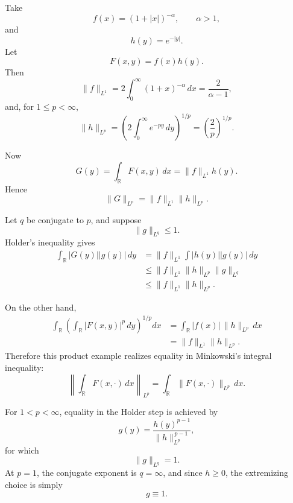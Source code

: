 \begin{solution}
Take
\[
f(x)
=
(1+|x|)^{-\alpha},
\qquad
\alpha>1,
\]
and
\[
h(y)=e^{-|y|}.
\]
Let
\[
F(x,y)=f(x)h(y).
\]
Then
\[
\|f\|_{L^1}
=
2\int_0^\infty(1+x)^{-\alpha}\,dx
=
\boxed{\frac{2}{\alpha-1}},
\]
and, for \(1\le p<\infty\),
\[
\|h\|_{L^p}
=
\left(
2\int_0^\infty e^{-py}\,dy
\right)^{1/p}
=
\boxed{
\left(\frac2p\right)^{1/p}.
}
\]

Now
\[
G(y)
=
\int_{\mathbb R}F(x,y)\,dx
=
\|f\|_{L^1}h(y).
\]
Hence
\[
\boxed{
\|G\|_{L^p}
=
\|f\|_{L^1}\|h\|_{L^p}.
}
\]

Let \(q\) be conjugate to \(p\), and suppose
\[
\|g\|_{L^q}\le1.
\]
Holder's inequality gives
\[
\begin{aligned}
\int_{\mathbb R}|G(y)||g(y)|\,dy
&=
\|f\|_{L^1}
\int|h(y)||g(y)|\,dy\\
&\le
\|f\|_{L^1}
\|h\|_{L^p}
\|g\|_{L^q}\\
&\le
\|f\|_{L^1}\|h\|_{L^p}.
\end{aligned}
\]

On the other hand,
\[
\begin{aligned}
\int_{\mathbb R}
\left(
\int_{\mathbb R}|F(x,y)|^p\,dy
\right)^{1/p}
dx
&=
\int_{\mathbb R}
|f(x)|\,\|h\|_{L^p}\,dx\\
&=
\|f\|_{L^1}\|h\|_{L^p}.
\end{aligned}
\]
Therefore this product example realizes equality in Minkowski's integral inequality:
\[
\boxed{
\left\|
\int_{\mathbb R}F(x,\cdot)\,dx
\right\|_{L^p}
=
\int_{\mathbb R}
\|F(x,\cdot)\|_{L^p}\,dx.
}
\]

For \(1<p<\infty\), equality in the Holder step is achieved by
\[
\boxed{
g(y)
=
\frac{h(y)^{p-1}}
{\|h\|_{L^p}^{\,p-1}},
}
\]
for which
\[
\|g\|_{L^q}=1.
\]
At \(p=1\), the conjugate exponent is \(q=\infty\), and since \(h\ge0\), the extremizing
choice is simply
\[
g\equiv1.
\]
\end{solution}
